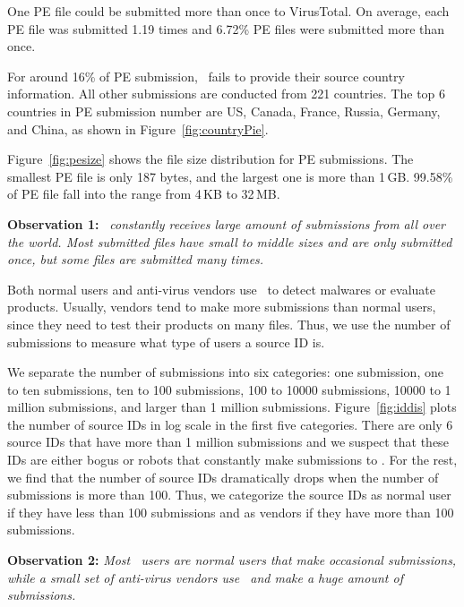 One PE file could be submitted more than once to VirusTotal. 
On average, each PE file was submitted 1.19 times and 6.72\% PE files were submitted more than once. 

For around 16\% of PE submission, 
\vt\ fails to provide their source country information. 
All other submissions are conducted from 221 countries. 
The top 6 countries in PE submission number are US, Canada, France, Russia, Germany, and China, 
as shown in Figure~\ref{fig:countryPie}.

Figure~\ref{fig:pesize} shows the file size distribution for PE submissions. 
The smallest PE file is only 187 bytes, and the largest one is more than 1\,GB. 
99.58\% of PE file fall into the range from 4\,KB to 32\,MB. 

{\bf Observation 1:} 
{\em \vt\ constantly receives large amount of submissions from all over the world. 
Most submitted files have small to middle sizes and are only submitted once, 
but some files are submitted many times.}


Both normal users and anti-virus vendors use \vt\ to detect malwares or evaluate products.
Usually, vendors tend to make more submissions than normal users, since they need to test their products on many files.
Thus, we use the number of submissions to measure what type of users a source ID is.

We separate the number of submissions into six categories:
one submission, one to ten submissions, ten to 100 submissions, 100 to 10000 submissions, 10000 to 1 million submissions, and larger than 1 million submissions.
Figure~\ref{fig:iddis} plots the number of source IDs in log scale in the first five categories.
There are only 6 source IDs that have more than 1 million submissions and we suspect that these IDs are either bogus or robots 
that constantly make submissions to \vt.
For the rest, we find that the number of source IDs dramatically drops when the number of submissions is more than 100.
Thus, we categorize the source IDs as normal user if they have less than 100 submissions and as vendors if they have more than 100 submissions.

{\bf Observation 2:} 
{\em Most \vt\ users are normal users that make occasional submissions, while a small set of anti-virus vendors use \vt\ and make a huge amount of submissions.}

